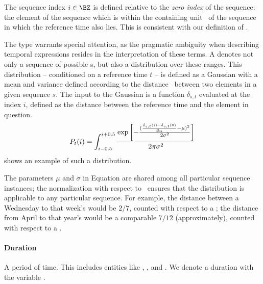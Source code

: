 The sequence index $i \in \BZ$ is defined relative to the 
	\textit{zero index} of the sequence:
	the element of the sequence
	which is within the containing unit \seqcanon\ of the sequence in which the 
	reference time also lies.
This is consistent with our definition of \seqelem.

The  type warrants special attention, as the pragmatic ambiguity 
	when describing temporal expressions resides in the interpretation of these
	terms.
A  denotes not only a sequence of possible
	s, but also a distribution over these ranges.
This distribution -- conditioned on a reference time $t$ --
	is defined as a Gaussian with a mean and variance defined according
	to the distance \seqjump\ between two elements in a given sequence $s$.
The input to the Gaussian is a function $\delta_{s,t}$ evaluated
	at the index $i$, defined as the distance between the reference time 
	and the element in question.
\begin{equation}
\label{eqn:gaussian}
	P_t(i) = 
	\int_{i-0.5}^{i+0.5}
		\frac{
			\exp\left[-\frac{
					(\frac{\delta_{s,t}(i)-\delta_{s,t}(0)}{\Delta_s} - \mu)^2
				}{
					2\sigma^2
				}
			\right]
		}{
			2\pi\sigma^2
		}
\end{equation}
 shows an example of such a distribution.

The parameters $\mu$ and $\sigma$ in Equation  are shared
	among all particular sequence instances; the normalization
	with respect to \seqjump\ ensures that the distribution is applicable
	to any particular sequence.
For example, the distance between a Wednesday to that week's 
	would be $2/7$, counted with respect to a ; 
	the distance from April to that year's  would be a 
	comparable $7/12$ (approximately), counted with respect to a .
	
\paragraph{Duration}
A period of time.
This includes entities like , , and .
We denote a duration with the variable \dur.

